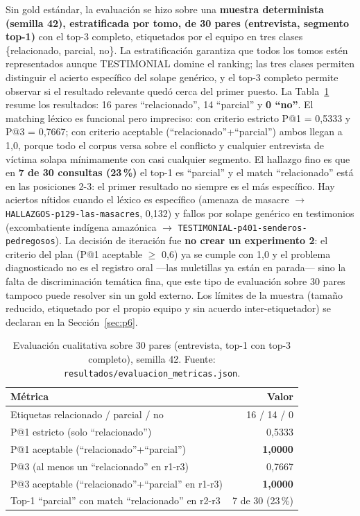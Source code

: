 \documentclass[11pt]{tg_usta}
\begin{document}
Sin gold estándar, la evaluación se hizo sobre una \textbf{muestra determinista (semilla 42), estratificada por tomo, de 30 pares (entrevista, segmento top-1)} con el top-3 completo, etiquetados por el equipo en tres clases \{relacionado, parcial, no\}. La estratificación garantiza que todos los tomos estén representados aunque TESTIMONIAL domine el ranking; las tres clases permiten distinguir el acierto específico del solape genérico, y el top-3 completo permite observar si el resultado relevante quedó cerca del primer puesto. La Tabla~\ref{tab:evaluacion} resume los resultados: 16 pares ``relacionado'', 14 ``parcial'' y \textbf{0 ``no''}. El matching léxico es funcional pero impreciso: con criterio estricto P@1 = 0,5333 y P@3 = 0,7667; con criterio aceptable (``relacionado''+``parcial'') ambos llegan a 1,0, porque todo el corpus versa sobre el conflicto y cualquier entrevista de víctima solapa mínimamente con casi cualquier segmento. El hallazgo fino es que en \textbf{7 de 30 consultas (23\,\%)} el top-1 es ``parcial'' y el match ``relacionado'' está en las posiciones 2-3: el primer resultado no siempre es el más específico. Hay aciertos nítidos cuando el léxico es específico (amenaza de masacre $\rightarrow$ \texttt{HALLAZGOS-p129-las-masacres}, 0,132) y fallos por solape genérico en testimonios (excombatiente indígena amazónica $\rightarrow$ \texttt{TESTIMONIAL-p401-senderos-pedregosos}). La decisión de iteración fue \textbf{no crear un experimento 2}: el criterio del plan (P@1 aceptable $\geq$ 0,6) ya se cumple con 1,0 y el problema diagnosticado no es el registro oral ---las muletillas ya están en parada--- sino la falta de discriminación temática fina, que este tipo de evaluación sobre 30 pares tampoco puede resolver sin un gold externo. Los límites de la muestra (tamaño reducido, etiquetado por el propio equipo y sin acuerdo inter-etiquetador) se declaran en la Sección~\ref{sec:p6}.

\begin{table}[htbp]
    \centering
    \caption{Evaluación cualitativa sobre 30 pares (entrevista, top-1 con top-3 completo), semilla 42. Fuente: \texttt{resultados/evaluacion\_metricas.json}.}
    \small
    \setlength{\tabcolsep}{6pt}
    \begin{tabular}{l r}
    \toprule
    Métrica & Valor \\
    \midrule
    Etiquetas relacionado / parcial / no & 16 / 14 / 0 \\
    P@1 estricto (solo ``relacionado'') & 0,5333 \\
    P@1 aceptable (``relacionado''+``parcial'') & \textbf{1,0000} \\
    P@3 (al menos un ``relacionado'' en r1-r3) & 0,7667 \\
    P@3 aceptable (``relacionado''+``parcial'' en r1-r3) & \textbf{1,0000} \\
    Top-1 ``parcial'' con match ``relacionado'' en r2-r3 & 7 de 30 (23\,\%) \\
    \bottomrule
    \end{tabular}
    \label{tab:evaluacion}
\end{table}
\end{document}

